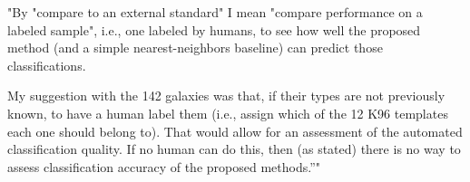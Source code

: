 "By "compare to an external standard" I mean "compare performance on a labeled sample", i.e., one labeled by humans, to see how well the proposed method (and a simple nearest-neighbors baseline) can predict those classifications. 

 

My suggestion with the 142 galaxies was that, if their types are not previously known, to have a human label them (i.e., assign which of the 12 K96 templates each one should belong to).  That would allow for an assessment of the automated classification quality.  If no human can do this, then (as stated) there is no way to assess classification accuracy of the proposed methods.”" 

